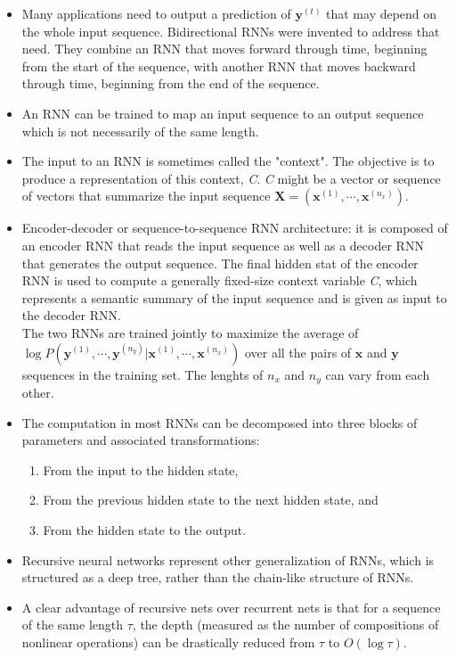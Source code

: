 \documentclass{article}
\begin{document}
\begin{itemize}
\item Many applications need to output a prediction of \(\boldsymbol{y}^{(t)}\) that may depend on the whole input sequence. Bidirectional RNNs were invented to address that need. They combine an RNN that moves forward through time, beginning from the start of the sequence, with another RNN that moves backward through time, beginning from the end of the sequence.
\item An RNN can be trained to map an input sequence to an output sequence which is not necessarily of the same length.
\item The input to an RNN is sometimes called the "context". The objective is to produce a representation of this context, \textit{C}. \textit{C} might be a vector or sequence of vectors that summarize the input sequence \(\boldsymbol{X} = (\boldsymbol{x}^{(1)}, \cdots, \boldsymbol{x}^{(n_x)})\).
\item Encoder-decoder or sequence-to-sequence RNN architecture: it is composed of an encoder RNN that reads the input sequence as well as a decoder RNN that generates the output sequence. The final hidden stat of the encoder RNN is used to compute a generally fixed-size context variable \textit{C}, which represents a semantic summary of the input sequence and is given as input to the decoder RNN.\\The two RNNs are trained jointly to maximize the average of \(\log{P(\boldsymbol{y}^{(1)},\cdots, \boldsymbol{y}^{(n_y)} | \boldsymbol{x}^{(1)}, \cdots, \boldsymbol{x}^{(n_x)})}\) over all the pairs of \(\boldsymbol{x}\) and \(\boldsymbol{y}\) sequences in the training set. The lenghts of \(n_x\) and \(n_y\) can vary from each other.
\item The computation in most RNNs can be decomposed into three blocks of parameters and associated transformations:
\begin{enumerate}
\item From the input to the hidden state,
\item From the previous hidden state to the next hidden state, and
\item From the hidden state to the output.
\end{enumerate}
\item Recursive neural networks represent other generalization of RNNs, which is structured as a deep tree, rather than the chain-like structure of RNNs.
\item A clear advantage of recursive nets over recurrent nets is that for a sequence of the same length \(\tau\), the depth (measured as the number of compositions of nonlinear operations) can be drastically reduced from \(\tau\) to \(O(\log{\tau})\).

\end{itemize}
\end{document}
